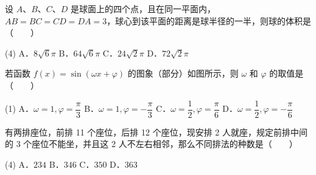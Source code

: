 \begin{question}
设 $A$、$B$、$C$、$D$ 是球面上的四个点，且在同一平面内，$AB = BC = CD = DA = 3$，球心到该平面的距离是球半径的一半，则球的体积是\mbox{（　　）}

\begin{gkopts}(4)
\task A．$8\sqrt{6}\pi$
\task B．$64\sqrt{6}\pi$
\task C．$24\sqrt{2}\pi$
\task D．$72\sqrt{2}\pi$
\end{gkopts}

\Needspace{0.4\textheight}
\end{question}
\begin{question}
若函数 $f(x) = \sin(\omega x + \varphi)$ 的图象（部分）如图所示，则 $\omega$ 和 $\varphi$ 的取值是\mbox{（　　）}
\nopagebreak[4]
\begin{center}\end{center}
\nopagebreak[4]
\begin{gkopts}(1)
\task A．$\omega = 1, \varphi = \dfrac{\pi}{3}$
\task B．$\omega = 1, \varphi = -\dfrac{\pi}{3}$
\task C．$\omega = \dfrac{1}{2}, \varphi = \dfrac{\pi}{6}$
\task D．$\omega = \dfrac{1}{2}, \varphi = -\dfrac{\pi}{6}$
\end{gkopts}

\end{question}
\begin{question}
有两排座位，前排 11 个座位，后排 12 个座位，现安排 2 人就座，规定前排中间的 3 个座位不能坐，并且这 2 人不左右相邻，那么不同排法的种数是\mbox{（　　）}

\begin{gkopts}(4)
\task A．$234$
\task B．$346$
\task C．$350$
\task D．$363$
\end{gkopts}

\end{question}

